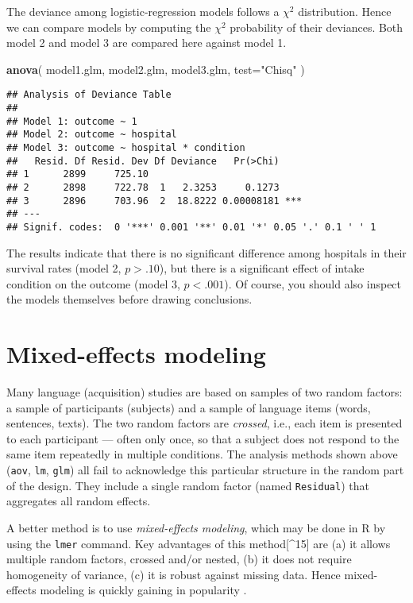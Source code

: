 \documentclass[]{book}
\newenvironment{Shaded}{\begin{snugshade}}{\end{snugshade}}
\newcommand{\DataTypeTok}[1]{\textcolor[rgb]{0.13,0.29,0.53}{#1}}
\newcommand{\KeywordTok}[1]{\textcolor[rgb]{0.13,0.29,0.53}{\textbf{#1}}}
\newcommand{\NormalTok}[1]{#1}
\newcommand{\StringTok}[1]{\textcolor[rgb]{0.31,0.60,0.02}{#1}}
\begin{document}
The deviance among logistic-regression models follows a \(\chi^2\)
distribution. Hence we can compare models by computing the \(\chi^2\)
probability of their deviances. Both model 2 and model 3
are compared here against model 1.

\begin{Shaded}
\begin{Highlighting}[]
\KeywordTok{anova}\NormalTok{( model1.glm, model2.glm, model3.glm, }\DataTypeTok{test=}\StringTok{"Chisq"}\NormalTok{ ) }
\end{Highlighting}
\end{Shaded}

\begin{verbatim}
## Analysis of Deviance Table
## 
## Model 1: outcome ~ 1
## Model 2: outcome ~ hospital
## Model 3: outcome ~ hospital * condition
##   Resid. Df Resid. Dev Df Deviance   Pr(>Chi)    
## 1      2899     725.10                           
## 2      2898     722.78  1   2.3253     0.1273    
## 3      2896     703.96  2  18.8222 0.00008181 ***
## ---
## Signif. codes:  0 '***' 0.001 '**' 0.01 '*' 0.05 '.' 0.1 ' ' 1
\end{verbatim}

The results indicate that there is no significant difference among
hospitals in their survival rates (model 2, \(p>.10\)), but there is a
significant effect of intake condition on the outcome (model 3,
\(p<.001\)). Of course, you should also inspect the models themselves
before drawing conclusions.

\hypertarget{ch:mixedeffects}{%
\chapter{Mixed-effects modeling}\label{ch:mixedeffects}}

Many language (acquisition) studies are based on samples of two random
factors: a sample of participants (subjects) and a sample of language
items (words, sentences, texts). The two random factors are \emph{crossed},
i.e., each item is presented to each participant --- often only once, so
that a subject does not respond to the same item repeatedly in multiple
conditions. The analysis methods shown above
(\texttt{aov}, \texttt{lm},
\texttt{glm}) all fail to acknowledge this particular
structure in the random part of the design. They include a single random
factor (named \texttt{Residual}) that aggregates all
random effects.

A better method is to use \emph{mixed-effects modeling},
which may be done in R by using the \texttt{lmer} command. Key
advantages of this method{[}\^{}15{]} are (a) it allows multiple random
factors, crossed and/or nested, (b) it does not require homogeneity of
variance, (c) it is robust against missing data. Hence mixed-effects
modeling is quickly gaining in popularity
\citep{QB04, QB08, baay08, HMS18}.
\end{document}
